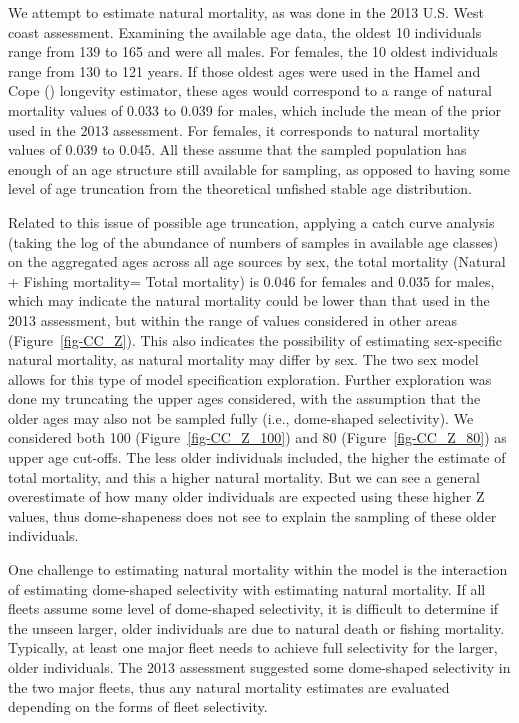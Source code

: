 \documentclass[
]{scrartcl}
\begin{document}
We attempt to estimate natural mortality, as was done in the 2013 U.S.
West coast assessment. Examining the available age data, the oldest 10
individuals range from 139 to 165 and were all males. For females, the
10 oldest individuals range from 130 to 121 years. If those oldest ages
were used in the Hamel and Cope
() longevity estimator, these
ages would correspond to a range of natural mortality values of 0.033 to
0.039 for males, which include the mean of the prior used in the 2013
assessment. For females, it corresponds to natural mortality values of
0.039 to 0.045. All these assume that the sampled population has enough
of an age structure still available for sampling, as opposed to having
some level of age truncation from the theoretical unfished stable age
distribution.

Related to this issue of possible age truncation, applying a catch curve
analysis (taking the log of the abundance of numbers of samples in
available age classes) on the aggregated ages across all age sources by
sex, the total mortality (Natural + Fishing mortality= Total mortality)
is 0.046 for females and 0.035 for males, which may indicate the natural
mortality could be lower than that used in the 2013 assessment, but
within the range of values considered in other areas
(Figure~\ref{fig-CC_Z}). This also indicates the possibility of
estimating sex-specific natural mortality, as natural mortality may
differ by sex. The two sex model allows for this type of model
specification exploration. Further exploration was done my truncating
the upper ages considered, with the assumption that the older ages may
also not be sampled fully (i.e., dome-shaped selectivity). We considered
both 100 (Figure~\ref{fig-CC_Z_100}) and 80 (Figure~\ref{fig-CC_Z_80})
as upper age cut-offs. The less older individuals included, the higher
the estimate of total mortality, and this a higher natural mortality.
But we can see a general overestimate of how many older individuals are
expected using these higher Z values, thus dome-shapeness does not see
to explain the sampling of these older individuals.

One challenge to estimating natural mortality within the model is the
interaction of estimating dome-shaped selectivity with estimating
natural mortality. If all fleets assume some level of dome-shaped
selectivity, it is difficult to determine if the unseen larger, older
individuals are due to natural death or fishing mortality. Typically, at
least one major fleet needs to achieve full selectivity for the larger,
older individuals. The 2013 assessment suggested some dome-shaped
selectivity in the two major fleets, thus any natural mortality
estimates are evaluated depending on the forms of fleet selectivity.
\end{document}
